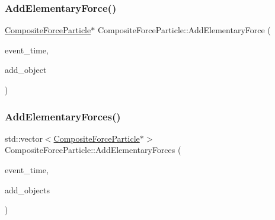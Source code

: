 \subsubsection{\texorpdfstring{Add\+Elementary\+Force()}{AddElementaryForce()}}
{\footnotesize\ttfamily \mbox{\hyperlink{class_composite_force_particle}{Composite\+Force\+Particle}}$\ast$ Composite\+Force\+Particle\+::\+Add\+Elementary\+Force (\begin{DoxyParamCaption}\item[{std\+::chrono\+::time\+\_\+point$<$ \mbox{\hyperlink{universe_8h_a0ef8d951d1ca5ab3cfaf7ab4c7a6fd80}{Clock}} $>$}]{event\+\_\+time,  }\item[{\mbox{\hyperlink{class_composite_force_particle}{Composite\+Force\+Particle}} $\ast$}]{add\+\_\+object }\end{DoxyParamCaption})}

\mbox{\label{class_composite_force_particle_ad0e97ed38272c7861d162afdf0db33c7}} 
\subsubsection{\texorpdfstring{Add\+Elementary\+Forces()}{AddElementaryForces()}}
{\footnotesize\ttfamily std\+::vector$<$\mbox{\hyperlink{class_composite_force_particle}{Composite\+Force\+Particle}}$\ast$$>$ Composite\+Force\+Particle\+::\+Add\+Elementary\+Forces (\begin{DoxyParamCaption}\item[{std\+::chrono\+::time\+\_\+point$<$ \mbox{\hyperlink{universe_8h_a0ef8d951d1ca5ab3cfaf7ab4c7a6fd80}{Clock}} $>$}]{event\+\_\+time,  }\item[{std\+::vector$<$ \mbox{\hyperlink{class_composite_force_particle}{Composite\+Force\+Particle}} $\ast$$>$}]{add\+\_\+objects }\end{DoxyParamCaption})}

\mbox{\label{class_composite_force_particle_a27924093abdaa2f19902a32a068fa324}} 
